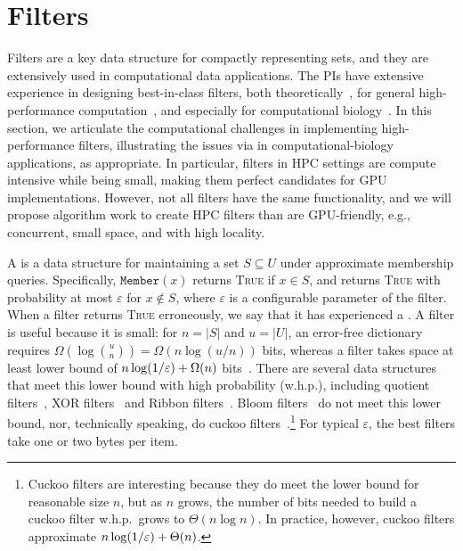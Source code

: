 
\section{Filters}

Filters are a key data structure for compactly representing sets, and they are extensively used in computational data applications.  The PIs have extensive experience in designing best-in-class filters, both theoretically~\cite{BenderFaGo18,BenderDaFa21,BenderFaKu22b,BenderCoFa23b}, for general high-performance computation~\cite{conway2020splinterdb,PandeyBeCo23,PandeyBJP17,BenderFaJo12}, and especially for computational biology~\cite{AlmodaresiPaFe18,PandeyAlBe18,PandeyBeJo18, AlmodaresiPaPa17,PandeyBeJo17b}.
In this section, we articulate the computational challenges in implementing high-performance filters, illustrating the issues via in computational-biology applications, as appropriate. 
In particular, filters in HPC settings are compute intensive while being small, making them perfect candidates for GPU implementations.  
However, not all filters have the same functionality, and we will propose algorithm work to create HPC filters than are GPU-friendly, e.g., concurrent, small space, and with high locality.



A  is a data structure for maintaining a set $S\subseteq U$ under approximate membership queries. Specifically, $\texttt{Member}(x)$ returns \textsc{True} if $x\in S$, and returns \textsc{True} with probability at most $\varepsilon$ for $x\notin S$, where $\varepsilon$ is a configurable parameter of the filter.  When a filter returns \textsc{True} erroneously, we say that it has experienced a .
%
A filter is useful because it is small: for $n= |S|$ and $u = |U|$, an error-free dictionary requires $\Omega\left(\log \binom{u}{n}\right) = \Omega(n \log (u/n))$ bits, whereas a filter  takes space at least  lower bound of $n\log (1/\varepsilon) + \Omega(n)$ bits~\cite{CarterFG78}.  There are several data structures that meet this lower bound with high probability (w.h.p.), including quotient filters~\cite{Cleary84,PaghPaRa05,DillingerM09,BenderFaJo12,PandeyBJP17,PandeyCDBFJ21}, XOR filters~\cite{GrafLe20} and Ribbon filters~\cite{DillingerW21}.  Bloom filters~\cite{Bloom70} do not meet this lower bound, nor, technically speaking, do cuckoo filters~\cite{FanAnKa14,BreslowJ18}.\footnote{Cuckoo filters are interesting because they do meet the lower bound for reasonable size $n$, but as $n$ grows, the number of bits needed to build a cuckoo filter w.h.p.\ grows to $\Theta(n\log n)$.  In practice, however, cuckoo filters approximate $n\log (1/\varepsilon) + \Theta(n)$.}
%
For typical $\varepsilon$, the best filters take one or two bytes per item.

